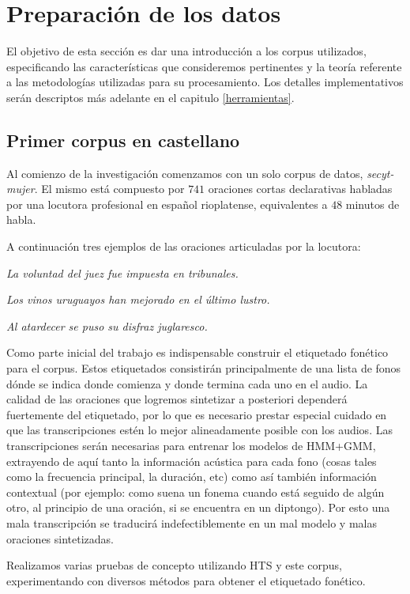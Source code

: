 \section{Preparación de los datos}

El objetivo de esta sección es dar una introducción a los corpus utilizados, especificando las características que consideremos pertinentes y la teoría referente a las metodologías utilizadas para su procesamiento. Los detalles implementativos serán descriptos más adelante en el capitulo \ref{herramientas}.

\subsection{Primer corpus en castellano}

Al comienzo de la investigación comenzamos con un solo corpus de datos, \textit{secyt-mujer}\cite{secytMujer}. El mismo está compuesto por $741$ oraciones cortas declarativas habladas por una locutora profesional en español rioplatense, equivalentes a $48$ minutos de habla.

A continuación tres ejemplos de las oraciones articuladas por la locutora:

\indent\indent \textit{La voluntad del juez fue impuesta en tribunales.}

\indent\indent \textit{Los vinos uruguayos han mejorado en el último lustro.}

\indent\indent \textit{Al atardecer se puso su disfraz juglaresco.}

Como parte inicial del trabajo es indispensable construir el etiquetado fonético para el corpus. Estos etiquetados consistirán principalmente de una lista de fonos dónde se indica donde comienza y donde termina cada uno en el audio. La calidad de las oraciones que logremos sintetizar a posteriori dependerá fuertemente del etiquetado, por lo que es necesario prestar especial cuidado en que las transcripciones estén lo mejor alineadamente posible con los audios. Las transcripciones serán necesarias para entrenar los modelos de HMM+GMM, extrayendo de aquí tanto la información acústica para cada fono (cosas tales como la frecuencia principal, la duración, etc) como así también información contextual (por ejemplo: como suena un fonema cuando está seguido de algún otro, al principio de una oración, si se encuentra en un diptongo). Por esto una mala transcripción se traducirá indefectiblemente en un mal modelo y malas oraciones sintetizadas.

Realizamos varias pruebas de concepto utilizando HTS y este corpus, experimentando con diversos métodos para obtener el etiquetado fonético. 

